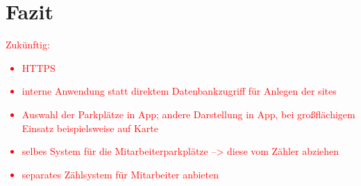\section{Fazit}\label{ch:Fazit}

\textcolor{red}{
	Zukünftig:
	\begin{itemize}
		\item HTTPS
		\item interne Anwendung statt direktem Datenbankzugriff für Anlegen der sites
		\item Auswahl der Parkplätze in App; andere Darstellung in App, bei großflächigem Einsatz beispielsweise auf Karte
		\item selbes System für die Mitarbeiterparkplätze --> diese vom Zähler abziehen
		\item separates Zählsystem für Mitarbeiter anbieten
	\end{itemize}
}

